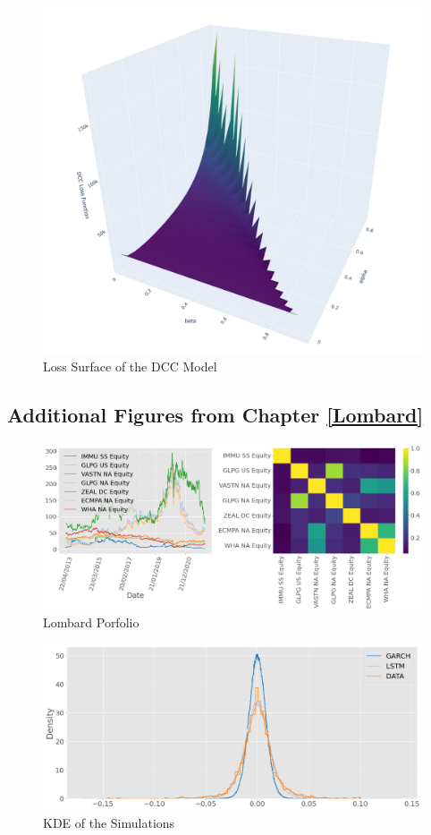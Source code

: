 \documentclass[a4paper, oneside]{discothesis}
\begin{document}
\begin{figure}[H]
    \centering
    \includegraphics[width = 12cm]{figures/dcc_loss.png}
    \caption{Loss Surface of the DCC Model}
    \label{dcc_surf}
\end{figure}

\subsection{Additional Figures from Chapter \ref{Lombard}}
\begin{figure}[H]
    \centering
    \includegraphics[width = 13cm]{figures/ll_portf.png}
    \caption{Lombard Porfolio}
    \label{ll_portf}
\end{figure}

\begin{figure}[H]
    \centering
    \includegraphics[width = 13cm]{figures/kde.png}
    \caption{KDE of the Simulations}
    \label{fig:kde}
\end{figure}

\printbibliography
\end{document}
